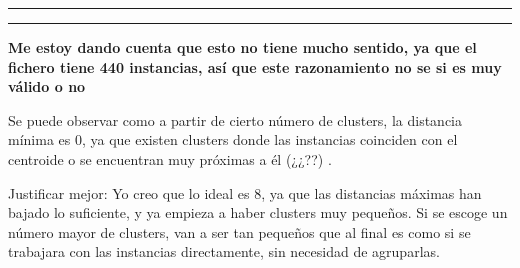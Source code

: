 \documentclass[11pt,a4paper]{article}
\begin{document}
\hrule
\hrule

\textbf{Me estoy dando cuenta que esto no tiene mucho sentido, ya que el
  fichero tiene 440 instancias, así que este razonamiento no se si es muy
  válido o no}


Se puede observar como a partir de cierto número de clusters, la distancia
mínima es 0, ya que existen clusters donde las instancias coinciden con el
centroide o se encuentran muy próximas a él {\color{red} (¿¿??) }.



Justificar mejor: Yo creo que lo ideal es 8, ya que las distancias máximas
han bajado lo suficiente, y ya empieza a haber clusters muy pequeños. Si se
escoge un número mayor de clusters, van a ser tan pequeños que al final es
como si se trabajara con las instancias directamente, sin necesidad de agruparlas.
\end{document}
